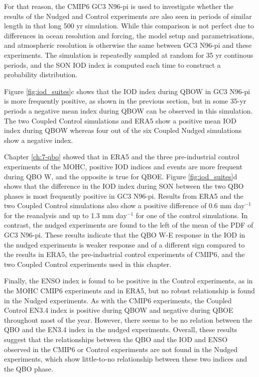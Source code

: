 For that reason, the CMIP6 GC3 N96-pi is used to investigate whether the results of the Nudged and Control experiments are also seen in periods of similar length in that long 500 yr simulation. While this comparison is not perfect due to differences in ocean resolution and forcing, the model setup and parametrisations, and atmospheric resolution is otherwise the same between GC3 N96-pi and these experiments. 
The simulation is repeatedly sampled at random for 35 yr continous periods, and the SON IOD index is computed each time to construct a probability distribution.  

Figure \ref{fig:iod_suites}c shows that the IOD index during QBOW in GC3 N96-pi is more frequently positive, as shown in the previous section, but in some 35-yr periods a negative mean index during QBOW can be observed in this simulation. The two Coupled Control simulations and ERA5 show a positive mean IOD index during QBOW whereas four out of the six Coupled Nudged simulations show a negative index. 

Chapter \ref{ch:7-qbo} showed that in ERA5 and the three pre-industrial control experiments of the MOHC, positive IOD indices and events are more frequent during QBO W, and the opposite is true for QBOE. Figure \ref{fig:iod_suites}d  shows that the difference in the IOD index during SON between the two QBO phases is most frequently positive in GC3 N96-pi.  
Results from ERA5 and the two Coupled Control simulations also show a positive difference of 0.6 mm day$^{-1}$ for the reanalysis and up to 1.3 mm day$^{-1}$ for one of the control simulations. 
In contrast, the nudged experiments are found to the left of the mean of the PDF of GC3 N96-pi.
These results indicate that the QBO W-E response in the IOD in the nudged experiments is  weaker response and of a different sign compared to the results in ERA5, the pre-industrial control experiments of CMIP6, and the two Coupled Control experiments used in this chapter. 

Finally, the ENSO index is found to be positive in the Control experiments, as in the MOHC CMIP6 experiments and in ERA5, but no robust relationship is found in the Nudged experiments. As with the CMIP6 experiments, the Coupled Control EN3.4 index is positive during QBOW and negative during QBOE throughout most of the year. However, there seems to be no relation between the QBO and the EN3.4 index in the nudged experiments. 
Overall, these results suggest that the relationships between the QBO and the IOD and ENSO observed in the CMIP6 or Control experiments are not found in the Nudged experiments, which show little-to-no relationship between these two indices and the QBO phase.

